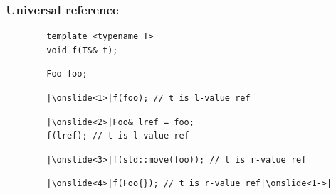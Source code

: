 \documentclass{beamer}
\begin{document}
\begin{frame}[fragile,t]
\frametitle{Universal reference}
    \begin{lstlisting}
        template <typename T>
        void f(T&& t);
    \end{lstlisting}

    \begin{lstlisting}
        Foo foo;
    \end{lstlisting}
    
    \begin{lstlisting}
        |\onslide<1>|f(foo); // t is l-value ref
    \end{lstlisting}

    \begin{lstlisting}
        |\onslide<2>|Foo& lref = foo;
        f(lref); // t is l-value ref
    \end{lstlisting}

    \begin{lstlisting}
        |\onslide<3>|f(std::move(foo)); // t is r-value ref
    \end{lstlisting}

    \begin{lstlisting}
        |\onslide<4>|f(Foo{}); // t is r-value ref|\onslide<1->|
    \end{lstlisting}

\end{frame}
\end{document}
